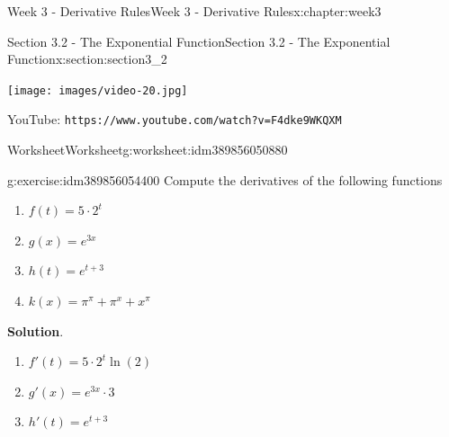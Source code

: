 \documentclass[oneside,10pt,]{book}
\newcommand{\blocktitlefont}{\relax}
\newcommand{\mono}[1]{\texttt{#1}}
\numberwithin{equation}{section}
\newlength{\qrsize}
\newlength{\previewwidth}
\begin{document}
\begin{chapterptx}{Week 3 - Derivative Rules}{}{Week 3 - Derivative Rules}{}{}{x:chapter:week3}
\typeout{************************************************}
%
\begin{sectionptx}{Section 3.2 - The Exponential Function}{}{Section 3.2 - The Exponential Function}{}{}{x:section:section3_2}
\setlength{\qrsize}{9em}
\setlength{\previewwidth}{\linewidth}
\addtolength{\previewwidth}{-\qrsize}
\begin{tcbraster}[raster columns=2, raster column skip=1pt, raster halign=center, raster force size=false, raster left skip=0pt, raster right skip=0pt]%
\begin{tcolorbox}[previewstyle, width=\previewwidth]%
\texttt{[image: images/video-20.jpg]}%
\end{tcolorbox}%
\begin{tcolorbox}[qrstyle]%
{\hypersetup{urlcolor=black}}%
\end{tcolorbox}%
\begin{tcolorbox}[captionstyle]%
\small YouTube: \mono{https://www.youtube.com/watch?v=F4dke9WKQXM}\end{tcolorbox}%
\end{tcbraster}%
%
%
\typeout{************************************************}
\typeout{************************************************}
%
\begin{worksheet-subsection}{Worksheet}{}{Worksheet}{}{}{g:worksheet:idm389856050880}
\begin{divisionexercise}{1}{}{}{g:exercise:idm389856054400}%
Compute the derivatives of the following functions%
%
\begin{enumerate}[label=(\alph*)]
\item{}\(\displaystyle f(t) = 5\cdot 2^t\)%
\item{}\(\displaystyle g(x) = e^{3x}\)%
\item{}\(\displaystyle h(t) = e^{t+3}\)%
\item{}\(\displaystyle k(x) = \pi^{\pi}+\pi^x+x^{\pi}\)%
\end{enumerate}
\textbf{\blocktitlefont Solution}.\hypertarget{g:solution:idm389856063296}{}\quad{}%
\begin{enumerate}[label=(\alph*)]
\item{}\(\displaystyle f'(t) = 5\cdot 2^t \ln(2)\)%
\item{}\(\displaystyle g'(x) = e^{3x}\cdot 3\)%
\item{}\(\displaystyle h'(t) = e^{t+3}\)%

\end{enumerate}
\end{divisionexercise}
\end{worksheet-subsection}
\end{sectionptx}
\end{chapterptx}
\end{document}
